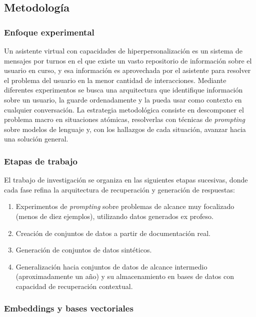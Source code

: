 \subsection{Metodología}

\subsubsection{Enfoque experimental}

Un asistente virtual con capacidades de hiperpersonalización es un sistema de mensajes por turnos en el que existe un vasto repositorio de información sobre el usuario en curso, y esa información es aprovechada por el asistente para resolver el problema del usuario en la menor cantidad de interacciones. Mediante diferentes experimentos se busca una arquitectura que identifique información sobre un usuario, la guarde ordenadamente y la pueda usar como contexto en cualquier conversación. La estrategia metodológica consiste en descomponer el problema macro en situaciones atómicas, resolverlas con técnicas de \textit{prompting} sobre modelos de lenguaje y, con los hallazgos de cada situación, avanzar hacia una solución general.

\subsubsection{Etapas de trabajo}

El trabajo de investigación se organiza en las siguientes etapas sucesivas, donde cada fase refina la arquitectura de recuperación y generación de respuestas:

\begin{enumerate}
	\item Experimentos de \textit{prompting} sobre problemas de alcance muy focalizado (menos de diez ejemplos), utilizando datos generados ex profeso.
	\item Creación de conjuntos de datos a partir de documentación real.
	\item Generación de conjuntos de datos sintéticos.
	\item Generalización hacia conjuntos de datos de alcance intermedio (aproximadamente un año) y su almacenamiento en bases de datos con capacidad de recuperación contextual.
\end{enumerate}

\subsubsection{Embeddings y bases vectoriales}

